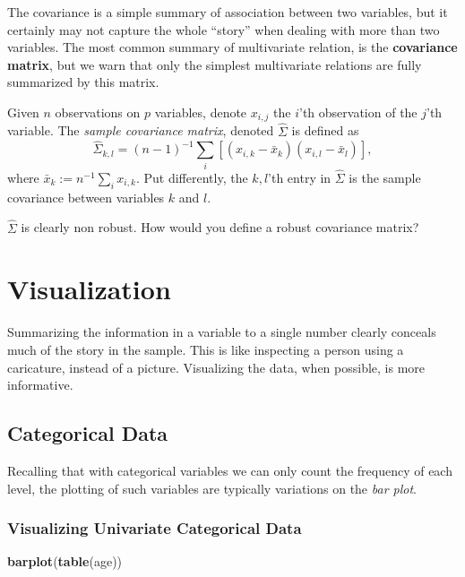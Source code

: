 \documentclass[]{book}
\newenvironment{Shaded}{\begin{snugshade}}{\end{snugshade}}
\newcommand{\KeywordTok}[1]{\textcolor[rgb]{0.13,0.29,0.53}{\textbf{#1}}}
\newcommand{\NormalTok}[1]{#1}
\theoremstyle{definition}
\theoremstyle{definition}
\theoremstyle{definition}
\theoremstyle{remark}
\let\BeginKnitrBlock\begin \let\EndKnitrBlock\end
\begin{document}
The covariance is a simple summary of association between two variables,
but it certainly may not capture the whole ``story'' when dealing with
more than two variables. The most common summary of multivariate
relation, is the \textbf{covariance matrix}, but we warn that only the
simplest multivariate relations are fully summarized by this matrix.

\BeginKnitrBlock{definition}[Sample Covariance Matrix]
\protect\hypertarget{def:unnamed-chunk-111}{}{\label{def:unnamed-chunk-111}
{} }Given \(n\) observations on
\(p\) variables, denote \(x_{i,j}\) the \(i\)'th observation of the
\(j\)'th variable. The \emph{sample covariance matrix}, denoted
\(\hat \Sigma\) is defined as
\[\hat \Sigma_{k,l}=(n-1)^{-1} \sum_i [(x_{i,k}-\bar x_k)(x_{i,l}-\bar x_l)],\]
where \(\bar x_k:=n^{-1} \sum_i x_{i,k}\). Put differently, the
\(k,l\)'th entry in \(\hat \Sigma\) is the sample covariance between
variables \(k\) and \(l\).
\EndKnitrBlock{definition}

\BeginKnitrBlock{remark}
{}\(\hat \Sigma\) is clearly non robust. How
would you define a robust covariance matrix?
\EndKnitrBlock{remark}

\section{Visualization}\label{visualization}

Summarizing the information in a variable to a single number clearly
conceals much of the story in the sample. This is like inspecting a
person using a caricature, instead of a picture. Visualizing the data,
when possible, is more informative.

\subsection{Categorical Data}\label{categorical-data-1}

Recalling that with categorical variables we can only count the
frequency of each level, the plotting of such variables are typically
variations on the \emph{bar plot}.

\subsubsection{Visualizing Univariate Categorical
Data}\label{visualizing-univariate-categorical-data}

\begin{Shaded}
\begin{Highlighting}[]
\KeywordTok{barplot}\NormalTok{(}\KeywordTok{table}\NormalTok{(age))}
\end{Highlighting}
\end{Shaded}
\end{document}

